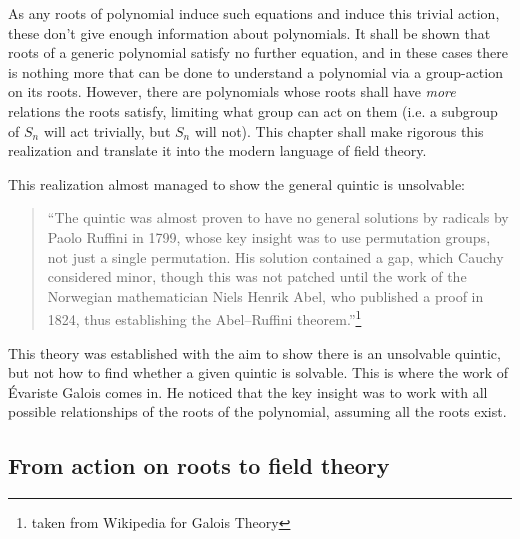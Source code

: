 \documentclass{article}
\begin{document}
As any roots of polynomial induce such equations and induce this trivial action, these don't give enough
information about polynomials. It shall be shown that roots of a generic polynomial satisfy no further
equation, and in these cases there is nothing more that can be done to understand a polynomial via a
group-action on its roots. However, there are polynomials whose roots shall have \emph{more} relations the
roots satisfy, limiting what group can act on them (i.e. a subgroup of $S_n$ will act trivially, but $S_n$
will not). This chapter shall make rigorous this realization and translate it into the modern language of
field theory.

This realization almost managed to show the general quintic is unsolvable:

\begin{quote}
	``The quintic was almost proven to have no general solutions by radicals by Paolo Ruffini in 1799,
	whose key insight was to use permutation groups, not just a single permutation. His solution
	contained a gap, which Cauchy considered minor, though this was not patched until the work of the
	Norwegian mathematician Niels Henrik Abel, who published a proof in 1824, thus establishing the
	Abel–Ruffini theorem.''\footnote{taken from Wikipedia for Galois Theory}
\end{quote}

This theory was established with the aim to show there is an unsolvable  quintic, but not how to find whether a given quintic is
solvable. This is where the work of \'Evariste Galois comes in. He noticed that the key insight was to work
with all possible relationships of the roots of the polynomial, assuming all the roots exist.


\subsection*{From action on roots to field theory}
\end{document}
